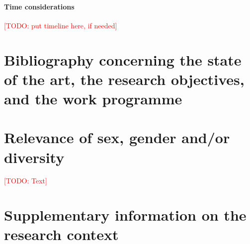 \documentclass[american,firsttime]{dfgproposal}
\newcommand{\todo}[1]{\xspace{\textcolor{red}{[TODO: #1]}}\xspace}
\begin{document}
	
	\paragraph*{Time considerations}
	\todo{put timeline here, if needed}
	
	
	
	\section{Bibliography concerning the state of the art, the research objectives, and the work programme}
	\label{sec:bib}
	\newrefcontext
	\printbibliography[notcategory=reviewed, notcategory=nonreviewed, notcategory=patents_pending, notcategory=patents, heading=none]
	
	\section{Relevance of sex, gender and/or diversity}
	\todo{Text}
	
	
	\clearpage
	\section{Supplementary information on the research context}
	
\end{document}
